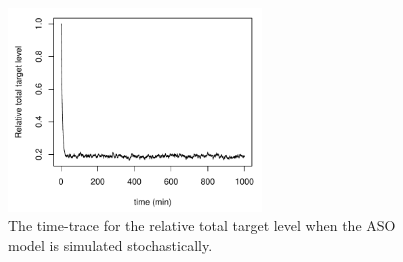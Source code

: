 \documentclass[a4paper,11pt]{article}
\newenvironment{Ncenter}{%
  \setlength\topsep{-10pt}
  \setlength\parskip{-100pt}
  \begin{center}
}{%
  \end{center}
}
\begin{document}
\begin{figure}[!h]
\begin{Ncenter}
\includegraphics[width=0.6\textwidth]{SuppFile1-Trel.pdf}
\end{Ncenter}
\caption{The time-trace for the relative total target level when the ASO model is simulated stochastically.}\label{fig:Trelstoc}
\end{figure}


\end{document}
